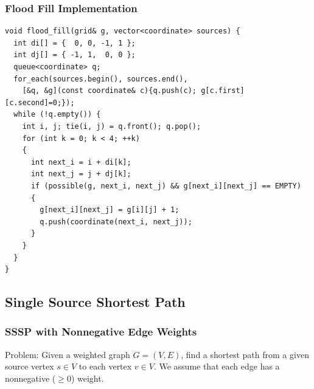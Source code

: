 \documentclass{beamer}
\begin{document}
\begin{frame}[containsverbatim]
\frametitle{Flood Fill Implementation}
\scriptsize
\begin{lstlisting}
void flood_fill(grid& g, vector<coordinate> sources) {
  int di[] = {  0, 0, -1, 1 };
  int dj[] = { -1, 1,  0, 0 };
  queue<coordinate> q;
  for_each(sources.begin(), sources.end(),
    [&q, &g](const coordinate& c){q.push(c); g[c.first][c.second]=0;});
  while (!q.empty()) {
    int i, j; tie(i, j) = q.front(); q.pop();
    for (int k = 0; k < 4; ++k)
    {
      int next_i = i + di[k];
      int next_j = j + dj[k];
      if (possible(g, next_i, next_j) && g[next_i][next_j] == EMPTY)
      {
        g[next_i][next_j] = g[i][j] + 1;
        q.push(coordinate(next_i, next_j));
      }
    }
  }
}
\end{lstlisting}

\end{frame}






\subsection{Single Source Shortest Path}

\begin{frame}%
\frametitle{SSSP with Nonnegative Edge Weights}

\begin{mdframed}[style=exampledefault]
Problem: Given a weighted graph $G = (V, E)$, find a shortest path from a given source vertex $s \in V$ to each vertex
$v \in V$. We assume that each edge has a nonnegative ($\ge 0$) weight.
\end{mdframed}


\end{frame}
\end{document}
